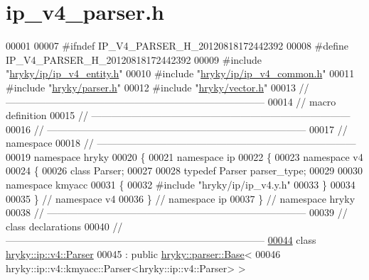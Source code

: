 \hypertarget{ip__v4__parser_8h_source}{\section{ip\-\_\-v4\-\_\-parser.\-h}
}

\begin{DoxyCode}
00001 
00007 \textcolor{preprocessor}{#ifndef IP\_V4\_PARSER\_H\_20120818172442392}
00008 \textcolor{preprocessor}{}\textcolor{preprocessor}{#define IP\_V4\_PARSER\_H\_20120818172442392}
00009 \textcolor{preprocessor}{}\textcolor{preprocessor}{#include "\hyperlink{ip__v4__entity_8h}{hryky/ip/ip_v4_entity.h}"}
00010 \textcolor{preprocessor}{#include "\hyperlink{ip__v4__common_8h}{hryky/ip/ip_v4_common.h}"}
00011 \textcolor{preprocessor}{#include "\hyperlink{parser_8h}{hryky/parser.h}"}
00012 \textcolor{preprocessor}{#include "\hyperlink{vector_8h}{hryky/vector.h}"}
00013 \textcolor{comment}{//
      ------------------------------------------------------------------------------}
00014 \textcolor{comment}{// macro definition}
00015 \textcolor{comment}{//
      ------------------------------------------------------------------------------}
00016 \textcolor{comment}{//
      ------------------------------------------------------------------------------}
00017 \textcolor{comment}{// namespace}
00018 \textcolor{comment}{//
      ------------------------------------------------------------------------------}
00019 \textcolor{keyword}{namespace }hryky
00020 \{
00021 \textcolor{keyword}{namespace }ip
00022 \{
00023 \textcolor{keyword}{namespace }v4
00024 \{
00026     \textcolor{keyword}{class }Parser;
00027 
00028     \textcolor{keyword}{typedef} Parser parser\_type;
00029 
00030 \textcolor{keyword}{namespace }kmyacc
00031 \{
00032 \textcolor{preprocessor}{#include "hryky/ip/ip\_v4.y.h"}
00033 \}
00034 
00035 \} \textcolor{comment}{// namespace v4}
00036 \} \textcolor{comment}{// namespace ip}
00037 \} \textcolor{comment}{// namespace hryky}
00038 \textcolor{comment}{//
      ------------------------------------------------------------------------------}
00039 \textcolor{comment}{// class declarations}
00040 \textcolor{comment}{//
      ------------------------------------------------------------------------------}
\hypertarget{ip__v4__parser_8h_source_l00044}{}\hyperlink{classhryky_1_1ip_1_1v4_1_1_parser}{00044} \textcolor{comment}{}\textcolor{keyword}{class }\hyperlink{classhryky_1_1ip_1_1v4_1_1_parser}{hryky::ip::v4::Parser}
00045     : \textcolor{keyword}{public} \hyperlink{classhryky_1_1parser_1_1_base}{hryky::parser::Base}<
00046         hryky::ip::v4::kmyacc::Parser<hryky::ip::v4::Parser> >

\end{DoxyCode}
